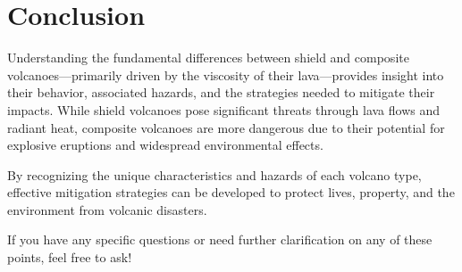 \documentclass{article}
\begin{document}
\section{Conclusion}
Understanding the fundamental differences between shield and composite volcanoes—primarily driven by the viscosity of their lava—provides insight into their behavior, associated hazards, and the strategies needed to mitigate their impacts. While shield volcanoes pose significant threats through lava flows and radiant heat, composite volcanoes are more dangerous due to their potential for explosive eruptions and widespread environmental effects.

By recognizing the unique characteristics and hazards of each volcano type, effective mitigation strategies can be developed to protect lives, property, and the environment from volcanic disasters.

If you have any specific questions or need further clarification on any of these points, feel free to ask!
\end{document}
